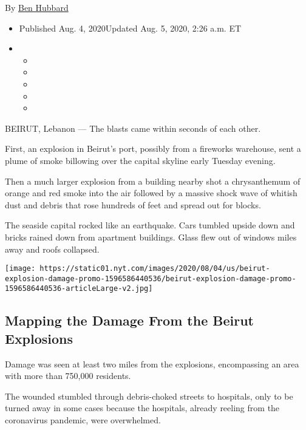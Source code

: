 By \href{https://www.nytimes.com/by/ben-hubbard}{Ben Hubbard}

\begin{itemize}
\item
  Published Aug. 4, 2020Updated Aug. 5, 2020, 2:26 a.m. ET
\item
  \begin{itemize}
  \item
  \item
  \item
  \item
  \item
  \end{itemize}
\end{itemize}

BEIRUT, Lebanon --- The blasts came within seconds of each other.

First, an explosion in Beirut's port, possibly from a fireworks
warehouse, sent a plume of smoke billowing over the capital skyline
early Tuesday evening.

Then a much larger explosion from a building nearby shot a chrysanthemum
of orange and red smoke into the air followed by a massive shock wave of
whitish dust and debris that rose hundreds of feet and spread out for
blocks.

The seaside capital rocked like an earthquake. Cars tumbled upside down
and bricks rained down from apartment buildings. Glass flew out of
windows miles away and roofs collapsed.

\href{https://www.nytimes.com/interactive/2020/08/04/world/middleeast/beirut-explosion-damage.html}{}

\texttt{[image: https://static01.nyt.com/images/2020/08/04/us/beirut-explosion-damage-promo-1596586440536/beirut-explosion-damage-promo-1596586440536-articleLarge-v2.jpg]}

\hypertarget{mapping-the-damage-from-the-beirut-explosions}{%
\subsection{Mapping the Damage From the Beirut
Explosions}\label{mapping-the-damage-from-the-beirut-explosions}}

Damage was seen at least two miles from the explosions, encompassing an
area with more than 750,000 residents.

The wounded stumbled through debris-choked streets to hospitals, only to
be turned away in some cases because the hospitals, already reeling from
the coronavirus pandemic, were overwhelmed.

